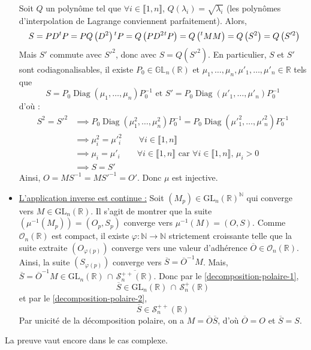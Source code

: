 \begin{demonstration}
\begin{itemize}
			Soit $Q$ un polynôme tel que $\forall i \in \llbracket 1, n \rrbracket$, $Q(\lambda_i) = \sqrt{\lambda_i}$ (les polynômes d'interpolation de Lagrange conviennent parfaitement). Alors,
			\[\ S = PD \mathstrut ^t P = PQ \left(D^2 \right) \mathstrut ^t P = Q \left(PD^2 \mathstrut ^t P \right) = Q \left(\mathstrut ^t M M \right) = Q \left(S^2 \right) = Q \left(S'^2 \right) \]
			Mais $S'$ commute avec $S'^2$, donc avec $S = Q \left(S'^2 \right)$. En particulier, $S$ et $S'$ sont codiagonalisables, il existe $P_0 \in \mathbb{GL}_n(\mathbb{R})$ et $\mu_1, \dots, \mu_n, \mu'_1, \dots, \mu'_n \in \mathbb{R}$ tels que
			\[ S = P_0 \operatorname{Diag}(\mu_1, \dots, \mu_n) P_0^{-1} \text{ et } S' = P_0 \operatorname{Diag} \left (\mu'_1, \dots, \mu'_n \right) P_0^{-1} \]
			d'où :
			\begin{align*}
				S^2 = S'^2 & \implies P_0 \operatorname{Diag} \left(\mu^2_1, \dots, \mu^2_n \right) P_0^{-1} = P_0 \operatorname{Diag} \left (\mu'^2_1, \dots, \mu'^2_n \right) P_0^{-1} \\
				& \implies \mu^2_i = \mu'^2_i \qquad \forall i \in \llbracket 1, n \rrbracket \\
				& \implies \mu_i = \mu'_i \qquad \forall i \in \llbracket 1, n \rrbracket \text{ car } \forall i \in \llbracket 1, n \rrbracket, \, \mu_i > 0 \\
				& \implies S = S'
			\end{align*}
			Ainsi, $O = MS^{-1} = MS'^{-1} = O'$. Donc $\mu$ est injective.
			\item \uline{L'application inverse est continue :} Soit $(M_p) \in \mathrm{GL}_n(\mathbb{R})^{\mathbb{N}}$ qui converge vers $M \in \mathrm{GL}_n(\mathbb{R})$. Il s'agit de montrer que la suite $\left (\mu^{-1} \left (M_p \right) \right) = (O_p, S_p)$ converge vers $\mu^{-1}(M) = (O, S)$. Comme $\mathcal{O}_n(\mathbb{R})$ est compact, il existe $\varphi : \mathbb{N} \rightarrow \mathbb{N}$ strictement croissante telle que la suite extraite $(O_{\varphi(p)})$ converge vers une valeur d'adhérence $\overline{O} \in \mathcal{O}_n(\mathbb{R})$. Ainsi, la suite $(S_{\varphi(p)})$ converge vers $\overline{S} = \overline{O}^{-1} M$.
			\newpar
			Mais, $\overline{S} = \overline{O}^{-1} M \in \mathrm{GL}_n(\mathbb{R}) \, \cap \, \overline{\mathcal{S}_n^{++}(\mathbb{R})}$. Donc par le \cref{decomposition-polaire-1},
			\[ \overline{S} \in \mathrm{GL}_n(\mathbb{R}) \, \cap \, \mathcal{S}_n^{+}(\mathbb{R}) \]
			et par le \cref{decomposition-polaire-2},
			\[ \overline{S} \in \mathcal{S}_n^{++}(\mathbb{R}) \]
			Par unicité de la décomposition polaire, on a $M = \overline{O} \overline{S}$, d'où $\overline{O} = O$ et $\overline{S} = S$.
		\end{itemize}
	\end{demonstration}

	\begin{remark}
		La preuve vaut encore dans le cas complexe.
	\end{remark}

